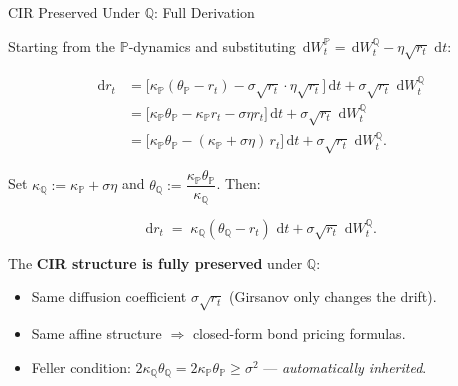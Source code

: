 \documentclass[compress]{beamer}
\newcommand{\PP}{\mathbb{P}}
\newcommand{\QQ}{\mathbb{Q}}
\newcommand{\dd}{\,\mathrm{d}}
\begin{document}
\begin{frame}{CIR Preserved Under $\QQ$: Full Derivation}

Starting from the $\PP$-dynamics and substituting $\dd W_t^\PP = \dd W_t^\QQ - \eta\sqrt{r_t}\,\dd t$:

\begin{align*}
	\dd r_t
	&= \Big[\kappa_\PP(\theta_\PP - r_t) - \sigma\sqrt{r_t} \cdot \eta\sqrt{r_t}\Big]\dd t + \sigma\sqrt{r_t}\,\dd W_t^\QQ \\
	&= \Big[\kappa_\PP\theta_\PP - \kappa_\PP r_t - \sigma\eta r_t\Big]\dd t + \sigma\sqrt{r_t}\,\dd W_t^\QQ \\
	&= \Big[\kappa_\PP\theta_\PP - (\kappa_\PP + \sigma\eta)\,r_t\Big]\dd t + \sigma\sqrt{r_t}\,\dd W_t^\QQ.
\end{align*}

Set $\kappa_\QQ := \kappa_\PP + \sigma\eta$ and $\theta_\QQ := \dfrac{\kappa_\PP\theta_\PP}{\kappa_\QQ}$. Then:

\[
	\boxed{\dd r_t \;=\; \kappa_\QQ(\theta_\QQ - r_t)\,\dd t + \sigma\sqrt{r_t}\,\dd W_t^\QQ.}
\]

\medskip
The \textbf{CIR structure is fully preserved} under $\QQ$:
\begin{itemize}
	\item Same diffusion coefficient $\sigma\sqrt{r_t}$ (Girsanov only changes the drift).
	\item Same affine structure $\Rightarrow$ closed-form bond pricing formulas.
	\item Feller condition: $2\kappa_\QQ\theta_\QQ = 2\kappa_\PP\theta_\PP \ge \sigma^2$ — \textit{automatically inherited}.
\end{itemize}

\end{frame}
\end{document}
